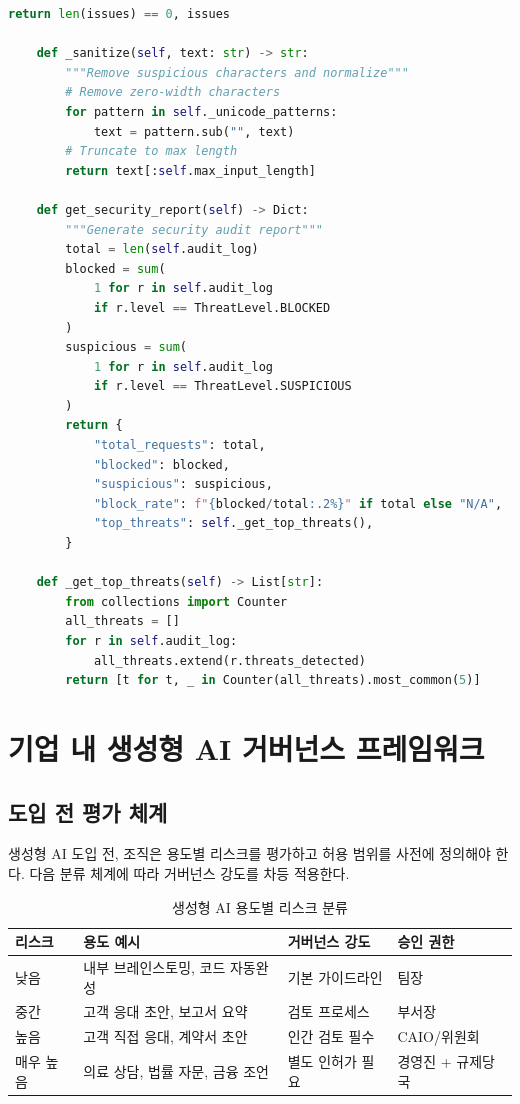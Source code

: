 \begin{lstlisting}[language=Python, caption={프롬프트 인젝션 방어 시스템}, label={lst:prompt_injection_defense}]
        return len(issues) == 0, issues

    def _sanitize(self, text: str) -> str:
        """Remove suspicious characters and normalize"""
        # Remove zero-width characters
        for pattern in self._unicode_patterns:
            text = pattern.sub("", text)
        # Truncate to max length
        return text[:self.max_input_length]

    def get_security_report(self) -> Dict:
        """Generate security audit report"""
        total = len(self.audit_log)
        blocked = sum(
            1 for r in self.audit_log
            if r.level == ThreatLevel.BLOCKED
        )
        suspicious = sum(
            1 for r in self.audit_log
            if r.level == ThreatLevel.SUSPICIOUS
        )
        return {
            "total_requests": total,
            "blocked": blocked,
            "suspicious": suspicious,
            "block_rate": f"{blocked/total:.2%}" if total else "N/A",
            "top_threats": self._get_top_threats(),
        }

    def _get_top_threats(self) -> List[str]:
        from collections import Counter
        all_threats = []
        for r in self.audit_log:
            all_threats.extend(r.threats_detected)
        return [t for t, _ in Counter(all_threats).most_common(5)]
\end{lstlisting}

\section{기업 내 생성형 AI 거버넌스 프레임워크}
\label{sec:gen.2}

\subsection{도입 전 평가 체계}
\label{sec:gen.2.1}

생성형 AI 도입 전, 조직은 용도별 리스크를 평가하고 허용 범위를 사전에 정의해야 한다. 다음 분류 체계에 따라 거버넌스 강도를 차등 적용한다.

\begin{table}[htbp]
\centering
\caption{생성형 AI 용도별 리스크 분류}
\label{tab:gen_usecase}
\begin{tabularx}{\textwidth}{p{2cm}Xp{3cm}p{3cm}}
\toprule
\textbf{리스크} & \textbf{용도 예시} & \textbf{거버넌스 강도} & \textbf{승인 권한} \\
\midrule
낮음 & 내부 브레인스토밍, 코드 자동완성 & 기본 가이드라인 & 팀장 \\
중간 & 고객 응대 초안, 보고서 요약 & 검토 프로세스 & 부서장 \\
높음 & 고객 직접 응대, 계약서 초안 & 인간 검토 필수 & CAIO/위원회 \\
매우 높음 & 의료 상담, 법률 자문, 금융 조언 & 별도 인허가 필요 & 경영진 + 규제당국 \\
\bottomrule
\end{tabularx}
\end{table}

